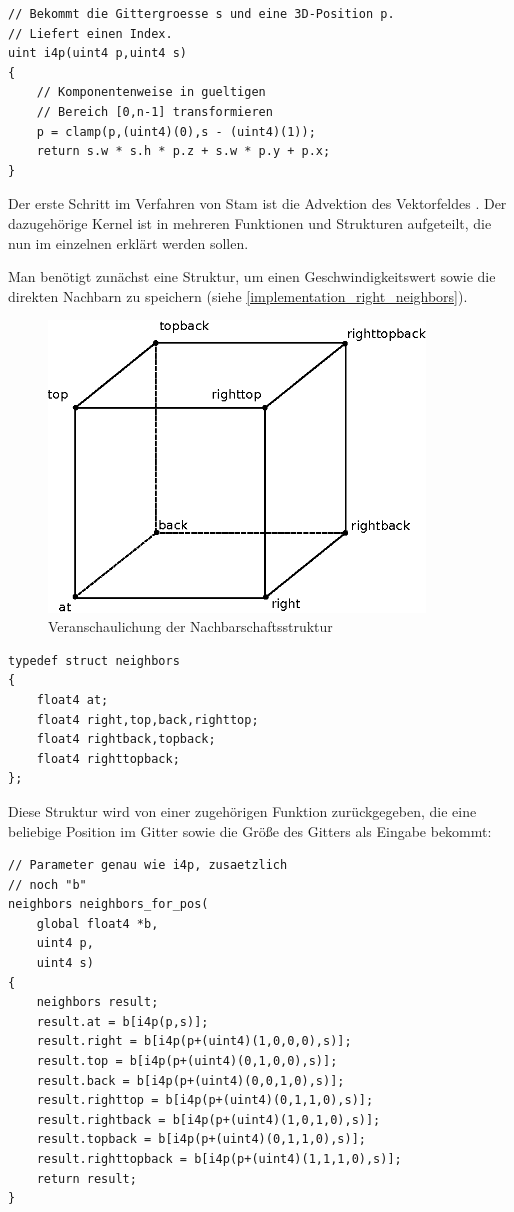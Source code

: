 \begin{lstlisting}
// Bekommt die Gittergroesse s und eine 3D-Position p.
// Liefert einen Index.
uint i4p(uint4 p,uint4 s)
{
	// Komponentenweise in gueltigen
	// Bereich [0,n-1] transformieren
	p = clamp(p,(uint4)(0),s - (uint4)(1));
	return s.w * s.h * p.z + s.w * p.y + p.x;
}
\end{lstlisting}

Der erste Schritt im Verfahren von Stam ist die Advektion des Vektorfeldes
. Der dazugehörige Kernel ist in mehreren Funktionen
und Strukturen aufgeteilt, die nun im einzelnen erklärt werden sollen.

Man benötigt zunächst eine Struktur, um einen Geschwindigkeitswert sowie die direkten
Nachbarn zu speichern (siehe \autoref{implementation_right_neighbors}).

\begin{figure}[ht]
\centering
\includegraphics[width=10cm]{images/right_neighborhood}
\caption{Veranschaulichung der Nachbarschaftsstruktur }
\label{fig:implementation_right_neighbors}
\end{figure}

\begin{lstlisting}
typedef struct neighbors
{
	float4 at;
	float4 right,top,back,righttop;
	float4 rightback,topback;
	float4 righttopback;
};
\end{lstlisting}

Diese Struktur wird von einer zugehörigen Funktion zurückgegeben, die eine
beliebige Position im Gitter sowie die Größe des Gitters als Eingabe bekommt:

\begin{lstlisting}
// Parameter genau wie i4p, zusaetzlich
// noch "b"
neighbors neighbors_for_pos(
	global float4 *b,
	uint4 p,
	uint4 s)
{
	neighbors result;
	result.at = b[i4p(p,s)];
	result.right = b[i4p(p+(uint4)(1,0,0,0),s)];
	result.top = b[i4p(p+(uint4)(0,1,0,0),s)];
	result.back = b[i4p(p+(uint4)(0,0,1,0),s)];
	result.righttop = b[i4p(p+(uint4)(0,1,1,0),s)];
	result.rightback = b[i4p(p+(uint4)(1,0,1,0),s)];
	result.topback = b[i4p(p+(uint4)(0,1,1,0),s)];
	result.righttopback = b[i4p(p+(uint4)(1,1,1,0),s)];
	return result;
}
\end{lstlisting}

